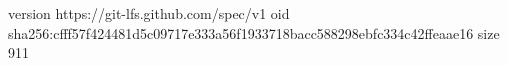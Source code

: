 version https://git-lfs.github.com/spec/v1
oid sha256:cfff57f424481d5c09717e333a56f1933718bacc588298ebfc334c42ffeaae16
size 911
